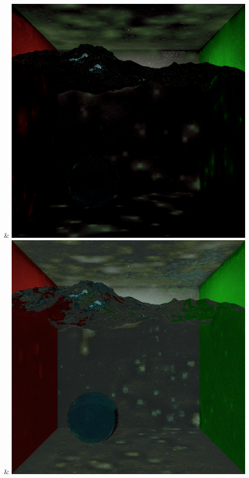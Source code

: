 & \includegraphics[width=\linewidth]{figures/py/tests/quality_comparison/nrc+pt_1spp_caustics_small.png}
& \includegraphics[width=\linewidth]{figures/py/tests/quality_comparison/nrc+pt+sl_1spp_caustics_small.png}
